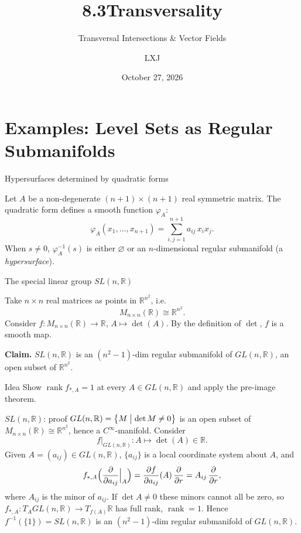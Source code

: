 \documentclass[10pt]{beamer}
\title{8.3\quad Transversality}
\subtitle{Transversal Intersections \& Vector Fields}
\date{October 27, 2026}
\author{LXJ}
\newcommand{\R}{\mathbb{R}}
\DeclareMathOperator{\rank}{rank}
\begin{document}
\maketitle

\section{Examples: Level Sets as Regular Submanifolds}

\begin{frame}{Hypersurfaces determined by quadratic forms}
	\begin{example} Let $A$ be a non-degenerate $(n+1)\times(n+1)$ real
		symmetric matrix. The quadratic form defines a smooth function
		$\varphi_A$:
		\[
			\varphi_A(x_1, \dots, x_{n+1})
			= \sum_{i,j=1}^{n+1} a_{ij}\, x_i x_j .
		\]
		When $s \neq 0$, $\varphi_A^{-1}(s)$ is either $\varnothing$ or an
		$n$-dimensional regular submanifold (a \emph{hypersurface}).
	\end{example}
\end{frame}

\begin{frame}{The special linear group $SL(n, \R)$}
	\begin{example}Take $n \times n$ real matrices as points in
		$\R^{n^2}$, i.e.\
		\[
			M_{n \times n}(\R) \cong \R^{n^2}.
		\]
		Consider $f : M_{n \times n}(\R) \longrightarrow \R$,\quad
		$A \longmapsto \det(A)$. By the definition of $\det$, $f$ is a
		smooth map.
		\medskip

		\textbf{Claim.} $SL(n, \R)$ is an $(n^2 - 1)$-dim regular
		submanifold of $GL(n, \R)$, an open subset of $\R^{n^2}$.
	\end{example}
	\medskip

	\begin{block}{Idea}
		Show $\rank f_{*,A} = 1$ at every $A \in GL(n, \R)$ and apply
		the pre-image theorem.
	\end{block}
\end{frame}

\begin{frame}{$SL(n, \R)$: proof}
	$GL(n, \R) = \bigl\{ M \bigm| \det M \neq 0 \bigr\}$ is an open
	subset of $M_{n \times n}(\R) \cong \R^{n^2}$, hence a
	$C^\infty$-manifold. Consider
	\[
		f\big|_{GL(n, \R)} : A \longmapsto \det(A) \in \R .
	\]
	Given $A = (a_{ij}) \in GL(n, \R)$, $\{ a_{ij} \}$ is a local
	coordinate system about $A$, and
	\[
		f_{*,A}\Bigl( \frac{\partial}{\partial a_{ij}} \Big|_{A} \Bigr)
		= \frac{\partial f}{\partial a_{ij}}(A)\, \frac{\partial}{\partial r}
		= A_{ij}\, \frac{\partial}{\partial r},
	\]
	where $A_{ij}$ is the minor of $a_{ij}$. If $\det A \neq 0$ these
	minors cannot all be zero, so
	$f_{*,A} : T_A GL(n, \R) \to T_{f(A)} \R$ has full rank, $\rank = 1$.
	Hence $f^{-1}(\{1\}) = SL(n, \R)$ is an $(n^2-1)$-dim regular
	submanifold of $GL(n, \R)$. \qedhere
\end{frame}
\end{document}
